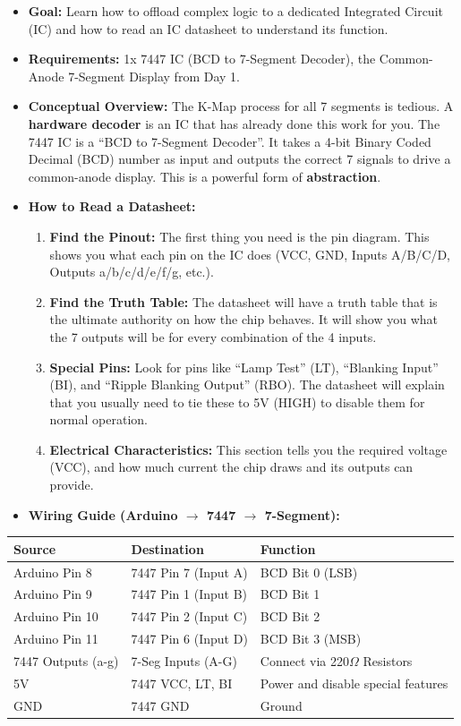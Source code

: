 \documentclass[11pt,a4paper]{article}
\begin{document}
\begin{itemize}
    \item \textbf{Goal:} Learn how to offload complex logic to a dedicated Integrated Circuit (IC) and how to read an IC datasheet to understand its function.
    \item \textbf{Requirements:} 1x 7447 IC (BCD to 7-Segment Decoder), the Common-Anode 7-Segment Display from Day 1.
    \item \textbf{Conceptual Overview:} The K-Map process for all 7 segments is tedious. A \textbf{hardware decoder} is an IC that has already done this work for you. The 7447 IC is a ``BCD to 7-Segment Decoder''. It takes a 4-bit Binary Coded Decimal (BCD) number as input and outputs the correct 7 signals to drive a common-anode display. This is a powerful form of \textbf{abstraction}.
    \item \textbf{How to Read a Datasheet:}
    \begin{enumerate}
        \item \textbf{Find the Pinout:} The first thing you need is the pin diagram. This shows you what each pin on the IC does (VCC, GND, Inputs A/B/C/D, Outputs a/b/c/d/e/f/g, etc.).
        \item \textbf{Find the Truth Table:} The datasheet will have a truth table that is the ultimate authority on how the chip behaves. It will show you what the 7 outputs will be for every combination of the 4 inputs.
        \item \textbf{Special Pins:} Look for pins like ``Lamp Test'' (LT), ``Blanking Input'' (BI), and ``Ripple Blanking Output'' (RBO). The datasheet will explain that you usually need to tie these to 5V (HIGH) to disable them for normal operation.
        \item \textbf{Electrical Characteristics:} This section tells you the required voltage (VCC), and how much current the chip draws and its outputs can provide.
    \end{enumerate}
    \item \textbf{Wiring Guide (Arduino $\to$ 7447 $\to$ 7-Segment):}
\end{itemize}

\begin{table}[h]
\centering
\begin{tabular}{lll}
\toprule
\textbf{Source} & \textbf{Destination} & \textbf{Function} \\
\midrule
Arduino Pin 8 & 7447 Pin 7 (Input A) & BCD Bit 0 (LSB) \\
Arduino Pin 9 & 7447 Pin 1 (Input B) & BCD Bit 1 \\
Arduino Pin 10 & 7447 Pin 2 (Input C) & BCD Bit 2 \\
Arduino Pin 11 & 7447 Pin 6 (Input D) & BCD Bit 3 (MSB) \\
7447 Outputs (a-g) & 7-Seg Inputs (A-G) & Connect via 220$\Omega$ Resistors \\
5V & 7447 VCC, LT, BI & Power and disable special features \\
GND & 7447 GND & Ground \\
\bottomrule
\end{tabular}
\end{table}
\end{document}
